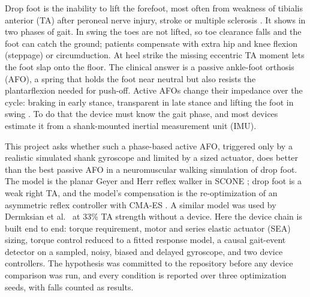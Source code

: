 Drop foot is the inability to lift the forefoot, most often from weakness of tibialis anterior (TA) after peroneal nerve injury, stroke or multiple sclerosis \cite{stewart2008}. It shows in two phases of gait. In swing the toes are not lifted, so toe clearance falls and the foot can catch the ground; patients compensate with extra hip and knee flexion (steppage) or circumduction. At heel strike the missing eccentric TA moment lets the foot slap onto the floor. The clinical answer is a passive ankle-foot orthosis (AFO), a spring that holds the foot near neutral but also resists the plantarflexion needed for push-off. Active AFOs change their impedance over the cycle: braking in early stance, transparent in late stance and lifting the foot in swing \cite{blaya2004}. To do that the device must know the gait phase, and most devices estimate it from a shank-mounted inertial measurement unit (IMU).

This project asks whether such a phase-based active AFO, triggered only by a realistic simulated shank gyroscope and limited by a sized actuator, does better than the best passive AFO in a neuromuscular walking simulation of drop foot. The model is the planar Geyer and Herr reflex walker \cite{geyer2010} in SCONE \cite{geijtenbeek2019}; drop foot is a weak right TA, and the model's compensation is the re-optimization of an asymmetric reflex controller with CMA-ES \cite{hansen2016}. A similar model was used by Dermksian et al.\ \cite{dermksian} at 33\% TA strength without a device. Here the device chain is built end to end: torque requirement, motor and series elastic actuator (SEA) sizing, torque control reduced to a fitted response model, a causal gait-event detector on a sampled, noisy, biased and delayed gyroscope, and two device controllers. The hypothesis was committed to the repository before any device comparison was run, and every condition is reported over three optimization seeds, with falls counted as results.
